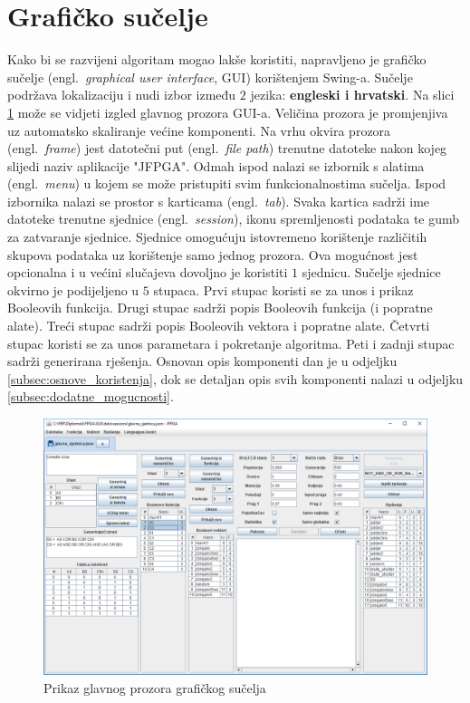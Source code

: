 \documentclass[times, utf8, diplomski]{fer}
\begin{document}

\section{Grafičko sučelje} \label{sec:gui}

Kako bi se razvijeni algoritam mogao lakše koristiti, napravljeno je grafičko sučelje (engl.~\textit{graphical user interface}, GUI) korištenjem Swing-a. Sučelje podržava lokalizaciju i nudi izbor između $2$ jezika: \textbf{engleski i hrvatski}. Na slici \ref{fig:gui} može se vidjeti izgled glavnog prozora GUI-a. Veličina prozora je promjenjiva uz automatsko skaliranje većine komponenti. Na vrhu okvira prozora (engl.~\textit{frame}) jest datotečni put (engl.~\textit{file path}) trenutne datoteke nakon kojeg slijedi naziv aplikacije "JFPGA". Odmah ispod nalazi se izbornik s alatima (engl.~\textit{menu}) u kojem se može pristupiti svim funkcionalnostima sučelja. Ispod izbornika nalazi se prostor s karticama (engl.~\textit{tab}). Svaka kartica sadrži ime datoteke trenutne sjednice (engl.~\textit{session}), ikonu spremljenosti podataka te gumb za zatvaranje sjednice. Sjednice omogućuju istovremeno korištenje različitih skupova podataka uz korištenje samo jednog prozora. Ova mogućnost jest opcionalna i u većini slučajeva dovoljno je koristiti $1$ sjednicu. Sučelje sjednice okvirno je podijeljeno u $5$ stupaca. Prvi stupac koristi se za unos i prikaz Booleovih funkcija. Drugi stupac sadrži popis Booleovih funkcija (i popratne alate). Treći stupac sadrži popis Booleovih vektora i popratne alate. Četvrti stupac koristi se za unos parametara i pokretanje algoritma. Peti i zadnji stupac sadrži generirana rješenja. Osnovan opis komponenti dan je u odjeljku \ref{subsec:osnove_koristenja}, dok se detaljan opis svih komponenti nalazi u odjeljku \ref{subsec:dodatne_mogucnosti}.

\begin{figure}[htb]
	\centering
	\includegraphics[width=1.0\textwidth]{img/GUI.png}
	\caption{Prikaz glavnog prozora grafičkog sučelja}
	\label{fig:gui}
\end{figure}
\end{document}
